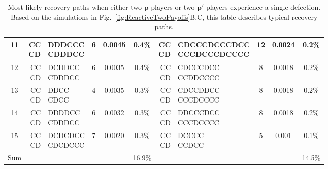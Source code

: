 \documentclass[9pt,twoside,lineno]{pnas-new}
\theoremstyle{plainCl1}
\theoremstyle{plainCl2}
\begin{document}
\begin{table}[t]
{\begin{tabular}{c|rlccc|rlccc}
    11 &  \cellcolor{gray!25} \makecell[r]{CC \\ CD} & \makecell[l]{ DDDCCC \\   CDDDCC} &  6 &  0.0045 & 0.4\%  &   \cellcolor{gray!25} \makecell[r]{CC \\ CD} & \makecell[l]{ CDCCCDCCCDCC \\  CCCDCCCDCCCC} &  12 &   0.0024 & 0.2\% \\ \hline
    12 &  \cellcolor{gray!25} \makecell[r]{CC \\ CD} & \makecell[l]{ DCDDCC \\   CDDDCC} &  6 &  0.0035 & 0.4\%  &   \cellcolor{gray!25} \makecell[r]{CC \\ CD} & \makecell[l]{     CDCCCDCC \\      CCDDCCCC} &   8 &   0.0018 & 0.2\% \\ \hline
    13 &  \cellcolor{gray!25} \makecell[r]{CC \\ CD} & \makecell[l]{   DDCC \\     CDCC} &  4 &  0.0035 & 0.3\%  &   \cellcolor{gray!25} \makecell[r]{CC \\ CD} & \makecell[l]{     CDCCDDCC \\      CCCDCCCC} &   8 &   0.0018 & 0.2\% \\ \hline
    14 &  \cellcolor{gray!25} \makecell[r]{CC \\ CD} & \makecell[l]{ DDDDCC \\   CDDDCC} &  6 &  0.0032 & 0.3\%  &   \cellcolor{gray!25} \makecell[r]{CC \\ CD} & \makecell[l]{     DDCCCDCC \\      CCCDCCCC} &   8 &   0.0018 & 0.2\% \\ \hline
    15 &  \cellcolor{gray!25} \makecell[r]{CC \\ CD} & \makecell[l]{DCDCDCC \\  CDCDCCC} &  7 &  0.0020 & 0.3\%  &   \cellcolor{gray!25} \makecell[r]{CC \\ CD} & \makecell[l]{        DCCCC \\         CCDCC} &   5 &   0.001 & 0.1\% \\  \hline
    Sum & & &  &  & 16.9\% & & & &  & 14.5\% \\
    \bottomrule
    \end{tabular}}
    \caption{Most likely recovery paths when either two $\mathbf{p}$ players or two $\mathbf{p'}$ players experience a single defection.
    {\normalfont Based on the simulations in Fig.~\ref{fig:ReactiveTwoPayoffs}B,C, this table describes typical recovery paths. 
}}
\end{table}
\end{document}
